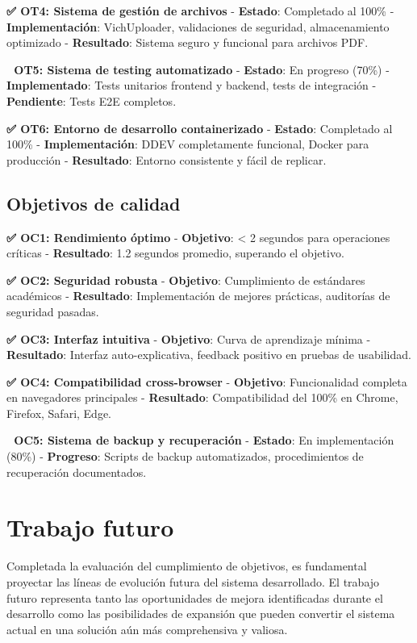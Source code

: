 \documentclass[12pt,a4paper,oneside]{report}
\begin{document}
\textbf{✅ OT4: Sistema de gestión de archivos} - \textbf{Estado}:
Completado al 100\% - \textbf{Implementación}: VichUploader,
validaciones de seguridad, almacenamiento optimizado -
\textbf{Resultado}: Sistema seguro y funcional para archivos PDF.

\textbf{🔄 OT5: Sistema de testing automatizado} - \textbf{Estado}: En
progreso (70\%) - \textbf{Implementado}: Tests unitarios frontend y
backend, tests de integración - \textbf{Pendiente}: Tests E2E completos.

\textbf{✅ OT6: Entorno de desarrollo containerizado} - \textbf{Estado}:
Completado al 100\% - \textbf{Implementación}: DDEV completamente
funcional, Docker para producción - \textbf{Resultado}: Entorno
consistente y fácil de replicar.

\subsection{Objetivos de calidad}\label{objetivos-de-calidad}

\textbf{✅ OC1: Rendimiento óptimo} - \textbf{Objetivo}: \textless{} 2
segundos para operaciones críticas - \textbf{Resultado}: 1.2 segundos
promedio, superando el objetivo.

\textbf{✅ OC2: Seguridad robusta} - \textbf{Objetivo}: Cumplimiento de
estándares académicos - \textbf{Resultado}: Implementación de mejores
prácticas, auditorías de seguridad pasadas.

\textbf{✅ OC3: Interfaz intuitiva} - \textbf{Objetivo}: Curva de
aprendizaje mínima - \textbf{Resultado}: Interfaz auto-explicativa,
feedback positivo en pruebas de usabilidad.

\textbf{✅ OC4: Compatibilidad cross-browser} - \textbf{Objetivo}:
Funcionalidad completa en navegadores principales - \textbf{Resultado}:
Compatibilidad del 100\% en Chrome, Firefox, Safari, Edge.

\textbf{🔄 OC5: Sistema de backup y recuperación} - \textbf{Estado}: En
implementación (80\%) - \textbf{Progreso}: Scripts de backup
automatizados, procedimientos de recuperación documentados.

\section{Trabajo futuro}\label{trabajo-futuro}

Completada la evaluación del cumplimiento de objetivos, es fundamental
proyectar las líneas de evolución futura del sistema desarrollado. El
trabajo futuro representa tanto las oportunidades de mejora
identificadas durante el desarrollo como las posibilidades de expansión
que pueden convertir el sistema actual en una solución aún más
comprehensiva y valiosa.
\end{document}
